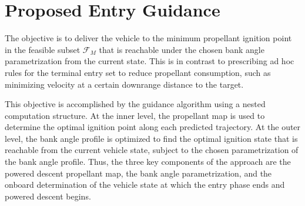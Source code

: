 \documentclass[letterpaper, preprint, paper,11pt]{AAS}
\begin{document}
\section{Proposed Entry Guidance}


The objective is to deliver the vehicle to the minimum propellant ignition point in the feasible subset $\mathcal{F}_M$ that is reachable under the chosen bank angle parametrization from the current state. This is in contrast to prescribing ad hoc rules for the terminal entry set to reduce propellant consumption, such as minimizing velocity at a certain downrange distance to the target. 

This objective is accomplished by the guidance algorithm using a nested computation structure. At the inner level, the propellant map is used to determine the optimal ignition point along each predicted trajectory. At the outer level, the bank angle profile is optimized to find the optimal ignition state that is reachable from the current vehicle state, subject to the chosen parametrization of the bank angle profile. Thus, the three key components of the approach are the powered descent propellant map, the bank angle parametrization, and the onboard determination of the vehicle state at which the entry phase ends and powered descent begins.


 
\end{document}
